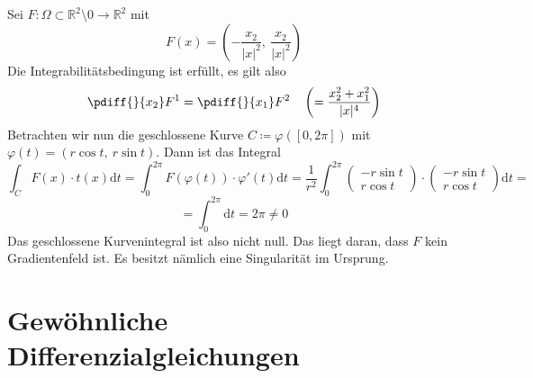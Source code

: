 \begin{beispiel}
Sei $F:\Omega\subset\mathbb{R}^2\setminus{0}\rightarrow\mathbb{R}^2$ mit
\begin{equation*}
	F(x)=\left(	-\frac{x_2}{|x|^2},\ \frac{x_2}{|x|^2 }\right)
\end{equation*}
Die Integrabilitätsbedingung ist erfüllt, es gilt also
\begin{equation*}
	\pdiff{}{x_2}F^1=\pdiff{}{x_1}F^2 \ \ \ 
	\left(=\frac{x_2^2+x_1^2}{|x|^4}\right)
\end{equation*}
Betrachten wir nun die geschlossene Kurve $C\coloneqq 
\varphi([0,2\pi])$ mit $\varphi(t)=(r\cos t,\ r\sin t)$. 
Dann ist das Integral
\begin{equation*}
	\int_C F(x)\cdot t(x)\mathrm{d}t = 
	\int_0^{2\pi}F(\varphi(t))\cdot\varphi'(t)\mathrm{d}t = 
	\frac{1}{r^2}\int_0^{2\pi}\begin{pmatrix}
	-r\sin t \\ r\cos t	\end{pmatrix} \cdot 
	\begin{pmatrix}
	-r\sin t \\ r\cos t	\end{pmatrix}\mathrm{d}t = 
\end{equation*}
\begin{equation*}
	= \int_0^{2\pi}\mathrm{d}t = 2\pi \neq 0
\end{equation*}
Das geschlossene Kurvenintegral ist also nicht null. Das liegt 
daran, dass $F$ kein Gradientenfeld ist. Es besitzt nämlich 
eine Singularität im Ursprung.
\end{beispiel}

\chapter{Gewöhnliche Differenzialgleichungen}


